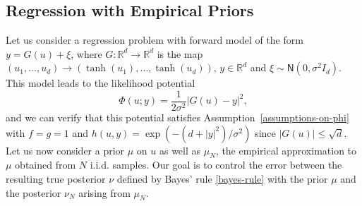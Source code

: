\documentclass[final]{siamart171218}
\newcommand{\bhtodo}[1]{\todo[linecolor=red,backgroundcolor=red!25,bordercolor=red]{#1}}
\newcommand{\mbb}{\mathbb}
\newcommand{\R}{\mbb{R}}
\newcommand{\N}{\mathsf{N}}
\begin{document}
\subsection{Regression with Empirical Priors}\label{sec:empirical-prior}
Let us consider a  regression problem with forward model of the form 
$    y = G(u) + \xi$,
where $ G: \R^d \to \R^d$ is the map 
$(u_1, \dots, u_d) \to ( \tanh(u_1), \dots, \tanh(u_d) )$, $y \in \R^d$ and 
$\xi \sim \N(0, \sigma^2 I_d)$. 
This model leads to the  likelihood potential 
\begin{equation*}
    \Phi(u;y) = \frac{1}{2\sigma^2} | G(u) - y |^2,
\end{equation*}
and we can verify that this potential satisfies Assumption~\ref{assumptions-on-phi} 
with $f = g = 1$ and 
 $h(u,y) = \exp( - (d +|y|^2)/\sigma^2)$ since $|G(u)|\le \sqrt{d}$.
Let us now consider 
a  prior $\mu$ on $u$ as well as $\mu_N$, the empirical 
approximation to $\mu$ obtained from $N$ i.i.d. samples. Our goal is to 
control the error between the resulting true posterior $\nu$ defined by Bayes' 
rule \eqref{bayes-rule} with the prior $\mu$ and the 
posterior $\nu_N$ arising from $\mu_N$. 
\end{document}
